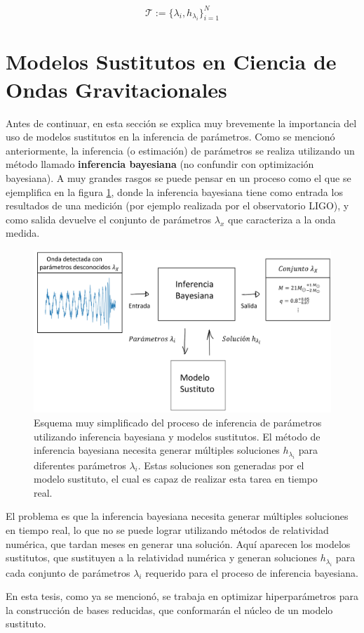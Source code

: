 \[
\mathcal{T} := \{ \lambda_i, h_{\lambda_i} \}_{i=1}^N
\]

\section{Modelos Sustitutos en Ciencia de Ondas Gravitacionales}

Antes de continuar, en esta sección se explica muy brevemente la importancia del uso de modelos sustitutos en la inferencia de parámetros.
Como se mencionó anteriormente, la inferencia (o estimación) de parámetros se realiza utilizando un método llamado \textbf{inferencia bayesiana} (no confundir con optimización bayesiana). A muy grandes rasgos se puede pensar en un proceso como el que se ejemplifica en la figura \ref{fig:diagrama}, donde la inferencia bayesiana tiene como entrada los resultados de una medición (por ejemplo realizada por el observatorio LIGO), y como salida devuelve el conjunto de parámetros $\lambda_x$ que caracteriza a la onda medida.  

\begin{figure}[h!]
\centering
\includegraphics[width=.8\columnwidth]{figs/diagrama-importancia-modelos.png}
\caption{Esquema muy simplificado del proceso de inferencia de parámetros utilizando inferencia bayesiana y modelos sustitutos. El método de inferencia bayesiana necesita generar múltiples soluciones $h_{\lambda_i}$ para diferentes parámetros $\lambda_i$. Estas soluciones son generadas por el modelo sustituto, el cual es capaz de realizar esta tarea en tiempo real.}
\label{fig:diagrama}
\end{figure}

El problema es que la inferencia bayesiana necesita generar múltiples soluciones en tiempo real, lo que no se puede lograr utilizando métodos de relatividad numérica, que tardan meses en generar una solución. Aquí aparecen los modelos sustitutos, que sustituyen a la relatividad numérica y generan soluciones $h_{\lambda_i}$ para cada conjunto de parámetros $\lambda_i$ requerido para el proceso de inferencia bayesiana.

En esta tesis, como ya se mencionó, se trabaja en optimizar hiperparámetros para la construcción de bases reducidas, que conformarán el núcleo de un modelo sustituto.




